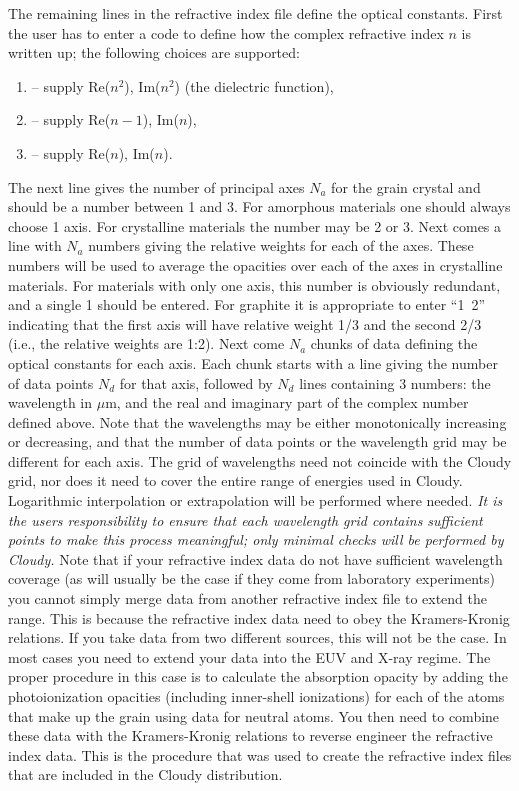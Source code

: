 The remaining lines in the refractive index file define the optical constants.
First the user has to enter a code to define how the complex refractive index
$n$ is written up; the following choices are supported:
\begin{enumerate}
\item
-- supply Re($n^2$), Im($n^2$) (the dielectric function),
\item
-- supply Re($n-1$), Im($n$),
\item
-- supply Re($n$), Im($n$).
\end{enumerate}
The next line gives the number of principal axes $N_a$ for the grain crystal
and should be a number between 1 and 3. For amorphous materials one should
always choose 1 axis. For crystalline materials the number may be 2 or 3. Next
comes a line with $N_a$ numbers giving the relative weights for each of the
axes. These numbers will be used to average the opacities over each of the
axes in crystalline materials. For materials with only one axis, this number
is obviously redundant, and a single 1 should be entered. For graphite it is
appropriate to enter ``1~2'' indicating that the first axis will have relative
weight 1/3 and the second 2/3 (i.e., the relative weights are 1:2). Next come
$N_a$ chunks of data defining the optical constants for each axis. Each chunk
starts with a line giving the number of data points $N_d$ for that axis,
followed by $N_d$ lines containing 3 numbers: the wavelength in $\mu$m, and
the real and imaginary part of the complex number defined above. Note that the
wavelengths may be either monotonically increasing or decreasing, and that the
number of data points or the wavelength grid may be different for each axis.
The grid of wavelengths need not coincide with the Cloudy grid, nor does it
need to cover the entire range of energies used in Cloudy. Logarithmic
interpolation or extrapolation will be performed where needed. {\em It is the
users responsibility to ensure that each wavelength grid contains sufficient
points to make this process meaningful; only minimal checks will be performed
by Cloudy.} Note that if your refractive index data do not have sufficient
wavelength coverage (as will usually be the case if they come from laboratory
experiments) you cannot simply merge data from another refractive index file
to extend the range. This is because the refractive index data need to obey
the Kramers-Kronig relations. If you take data from two different sources,
this will not be the case. In most cases you need to extend your data into the
EUV and X-ray regime. The proper procedure in this case is to calculate the
absorption opacity by adding the photoionization opacities (including
inner-shell ionizations) for each of the atoms that make up the grain using
data for neutral atoms. You then need to combine these data with the
Kramers-Kronig relations to reverse engineer the refractive index data. This
is the procedure that was used to create the refractive index files that are
included in the Cloudy distribution.

